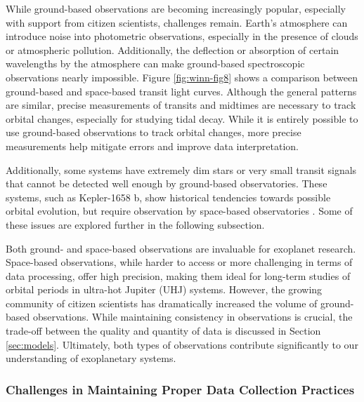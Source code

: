 \documentclass[oneside,12pt]{amsart}
\numberwithin{page}{section}
\begin{document}
While ground-based observations are becoming increasingly popular, especially with support from citizen scientists, challenges remain. Earth's atmosphere can introduce noise into photometric observations, especially in the presence of clouds or atmospheric pollution. Additionally, the deflection or absorption of certain wavelengths by the atmosphere can make ground-based spectroscopic observations nearly impossible. Figure \ref{fig:winn-fig8} shows a comparison between ground-based and space-based transit light curves. Although the general patterns are similar, precise measurements of transits and midtimes are necessary to track orbital changes, especially for studying tidal decay. While it is entirely possible to use ground-based observations to track orbital changes, more precise measurements help mitigate errors and improve data interpretation.

Additionally, some systems have extremely dim stars or very small transit signals that cannot be detected well enough by ground-based observatories. These systems, such as Kepler-1658 b, show historical tendencies towards possible orbital evolution, but require observation by space-based observatories \citep{adams2024doomed}. Some of these issues are explored further in the following subsection.

Both ground- and space-based observations are invaluable for exoplanet research. Space-based observations, while harder to access or more challenging in terms of data processing, offer high precision, making them ideal for long-term studies of orbital periods in ultra-hot Jupiter (UHJ) systems. However, the growing community of citizen scientists has dramatically increased the volume of ground-based observations. While maintaining consistency in observations is crucial, the trade-off between the quality and quantity of data is discussed in Section \ref{sec:models}. Ultimately, both types of observations contribute significantly to our understanding of exoplanetary systems.

\subsubsection{Challenges in Maintaining Proper Data Collection Practices}

\end{document}
